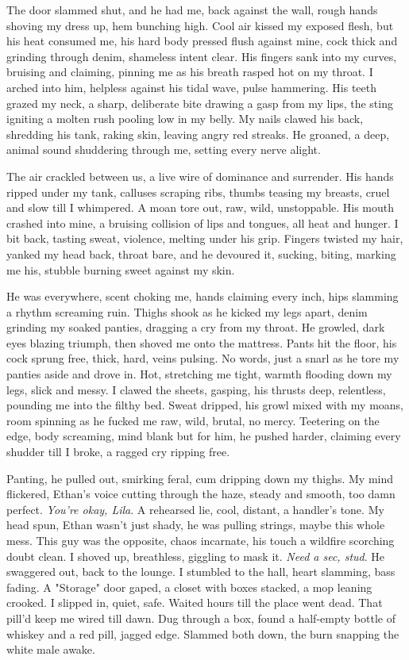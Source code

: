 \documentclass[12pt,oneside]{book} %
\begin{document}
The door slammed shut, and he had me, back against the wall, rough hands shoving my dress up, hem bunching high. Cool air kissed my exposed flesh, but his heat consumed me, his hard body pressed flush against mine, cock thick and grinding through denim, shameless intent clear. His fingers sank into my curves, bruising and claiming, pinning me as his breath rasped hot on my throat. I arched into him, helpless against his tidal wave, pulse hammering. His teeth grazed my neck, a sharp, deliberate bite drawing a gasp from my lips, the sting igniting a molten rush pooling low in my belly. My nails clawed his back, shredding his tank, raking skin, leaving angry red streaks. He groaned, a deep, animal sound shuddering through me, setting every nerve alight.

The air crackled between us, a live wire of dominance and surrender. His hands ripped under my tank, calluses scraping ribs, thumbs teasing my breasts, cruel and slow till I whimpered. A moan tore out, raw, wild, unstoppable. His mouth crashed into mine, a bruising collision of lips and tongues, all heat and hunger. I bit back, tasting sweat, violence, melting under his grip. Fingers twisted my hair, yanked my head back, throat bare, and he devoured it, sucking, biting, marking me his, stubble burning sweet against my skin.

He was everywhere, scent choking me, hands claiming every inch, hips slamming a rhythm screaming ruin. Thighs shook as he kicked my legs apart, denim grinding my soaked panties, dragging a cry from my throat. He growled, dark eyes blazing triumph, then shoved me onto the mattress. Pants hit the floor, his cock sprung free, thick, hard, veins pulsing. No words, just a snarl as he tore my panties aside and drove in. Hot, stretching me tight, warmth flooding down my legs, slick and messy. I clawed the sheets, gasping, his thrusts deep, relentless, pounding me into the filthy bed. Sweat dripped, his growl mixed with my moans, room spinning as he fucked me raw, wild, brutal, no mercy. Teetering on the edge, body screaming, mind blank but for him, he pushed harder, claiming every shudder till I broke, a ragged cry ripping free.

Panting, he pulled out, smirking feral, cum dripping down my thighs. My mind flickered, Ethan’s voice cutting through the haze, steady and smooth, too damn perfect. \textit{You’re okay, Lila}. A rehearsed lie, cool, distant, a handler’s tone. My head spun, Ethan wasn’t just shady, he was pulling strings, maybe this whole mess. This guy was the opposite, chaos incarnate, his touch a wildfire scorching doubt clean. I shoved up, breathless, giggling to mask it. \textit{Need a sec, stud}. He swaggered out, back to the lounge. I stumbled to the hall, heart slamming, bass fading. A "Storage" door gaped, a closet with boxes stacked, a mop leaning crooked. I slipped in, quiet, safe. Waited hours till the place went dead. That pill’d keep me wired till dawn. Dug through a box, found a half-empty bottle of whiskey and a red pill, jagged edge. Slammed both down, the burn snapping the white male awake.
\end{document}
